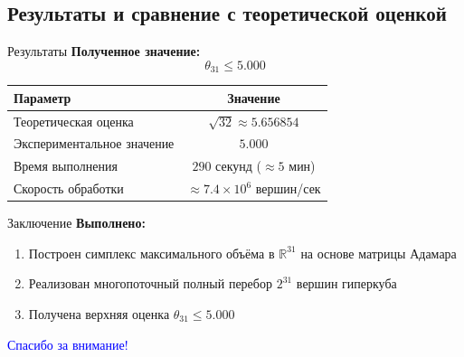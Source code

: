 \documentclass{beamer}
\begin{document}
\subsection{Результаты и сравнение с теоретической оценкой}
\begin{frame}{Результаты}
    \textbf{Полученное значение:}
    \[
    \boxed{\theta_{31} \le 5.000}
    \]

    \vspace{0.5cm}

    \begin{table}
    \centering
    \begin{tabular}{l|c}
    \hline
    \textbf{Параметр} & \textbf{Значение} \\
    \hline
    Теоретическая оценка & $\sqrt{32} \approx 5.656854$ \\
    Экспериментальное значение & $5.000$ \\
    Время выполнения & $290$ секунд ($\approx 5$ мин) \\
    Скорость обработки & $\approx 7.4 \times 10^6$ вершин/сек \\
    \hline
    \end{tabular}
    \end{table}

    \vspace{0.3cm}
\end{frame}

\begin{frame}{Заключение}
    \textbf{Выполнено:}
    \begin{enumerate}
        \item Построен симплекс максимального объёма в $\mathbb{R}^{31}$ на основе матрицы Адамара
        \item Реализован многопоточный полный перебор $2^{31}$ вершин гиперкуба
        \item Получена верхняя оценка $\theta_{31} \le 5.000$
    \end{enumerate}

    \vspace{0.5cm}
\end{frame}

\begin{frame}
    \centering
    \Huge \textcolor{blue}{Спасибо за внимание!}

    \vspace{0.5cm}
\end{frame}
\end{document}
